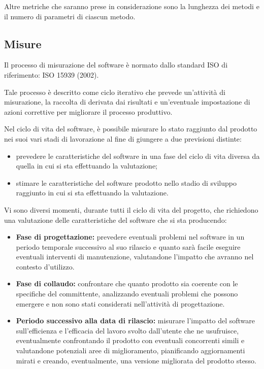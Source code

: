 Altre metriche che saranno prese in considerazione sono la lunghezza dei metodi e il numero di parametri di ciascun metodo.

\subsection{Misure}
Il processo di misurazione del software è normato dallo standard ISO di riferimento: ISO 15939  (2002).

Tale processo è descritto come ciclo iterativo che prevede un'attività di misurazione, la raccolta di  derivata dai risultati e un'eventuale impostazione di azioni correttive per migliorare il processo produttivo.

Nel ciclo di vita del software, è possibile misurare lo stato raggiunto dal prodotto nei suoi vari stadi di lavorazione al fine di giungere a due previsioni distinte:
\begin{itemize}
 \item prevedere le caratteristiche del software in una fase del ciclo di vita diversa da quella in cui si sta effettuando la valutazione;
\item stimare le caratteristiche del software prodotto nello stadio di sviluppo raggiunto in cui si sta effettuando la valutazione.
\end{itemize}

Vi sono diversi momenti, durante tutti il ciclo di vita del progetto, che richiedono una valutazione delle caratteristiche del software che si sta producendo:
\begin{itemize}
\item \textbf{Fase di progettazione:} prevedere eventuali problemi nel software in un periodo temporale successivo al suo rilascio e quanto sarà facile eseguire eventuali interventi di manutenzione, valutandone l'impatto che avranno nel contesto d'utilizzo.

\item \textbf{Fase di collaudo:} confrontare che quanto prodotto sia coerente con le specifiche del committente, analizzando eventuali problemi che possono emergere e non sono stati considerati nell'attività di progettazione.

\item \textbf{Periodo successivo alla data di rilascio:} misurare l'impatto del software sull'efficienza e l'efficacia del lavoro svolto dall'utente che ne usufruisce, eventualmente confrontando il prodotto con eventuali concorrenti simili e valutandone potenziali aree di miglioramento, pianificando aggiornamenti mirati e creando, eventualmente, una versione migliorata del prodotto stesso.
\end{itemize}


